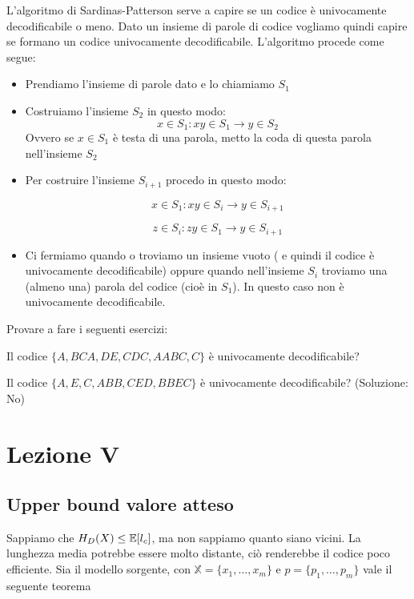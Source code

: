 \documentclass[12pt]{report}
\begin{document}
    L'algoritmo di Sardinas-Patterson serve a capire se un codice è univocamente decodificabile o meno.
    Dato un insieme di parole di codice vogliamo quindi capire se formano un codice univocamente decodificabile. L'algoritmo procede come segue:

    \begin{itemize}
        \item Prendiamo l'insieme di parole dato e lo chiamiamo $S_1$
        \item Costruiamo l'insieme $S_2$ in questo modo:
        $$x \in S_1 : xy \in S_1 \rightarrow y \in S_2$$
        Ovvero se $x \in S_1$ è testa di una parola, metto la coda di questa parola nell'insieme $S_2$
        \item Per costruire l'insieme $S_{i+1}$ procedo in questo modo:

        $$x \in S_1 : xy \in S_i \rightarrow y \in S_{i+1}$$

        $$z \in S_i : zy \in S_1 \rightarrow y \in S_{i+1}$$
        \item Ci fermiamo quando o troviamo un insieme vuoto ( e quindi il codice è univocamente decodificabile) oppure quando nell'insieme $S_i$ troviamo una (almeno una) parola del codice (cioè in $S_1$). In questo caso non è univocamente decodificabile.
    \end{itemize}
    Provare a fare i seguenti esercizi:

    \begin{es}
        Il codice $\{A,BCA,DE,CDC,AABC,C\}$ è univocamente decodificabile?
    \end{es}

    \begin{es}
        Il codice $\{A,E,C,ABB,CED,BBEC\}$ è univocamente decodificabile? (Soluzione: No)
    \end{es}

    \chapter{Lezione V}
    \label{cap:Lezione V}
    \section{Upper bound valore atteso}

    Sappiamo che $H_D(X) \leq \mathbb{E} [l_c]$, ma non sappiamo quanto siano vicini. La lunghezza media potrebbe essere molto distante, ciò renderebbe il codice poco efficiente.
    Sia \modello il modello sorgente, con $\mathbb{X} = \{x_1,\dots,x_m\}$ e $p = \{p_1,\dots,p_m\}$ vale il seguente teorema
\end{document}
